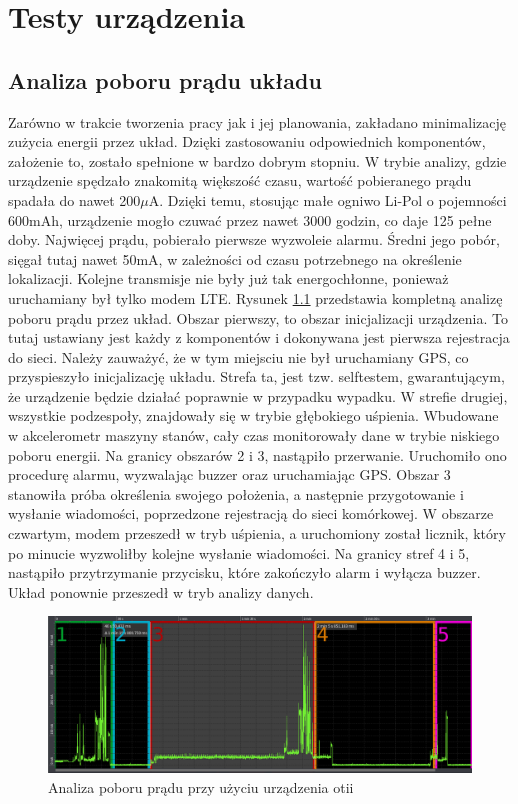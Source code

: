 \chapter{Testy urządzenia}
\section{Analiza poboru prądu układu}
Zarówno w trakcie tworzenia pracy jak i jej planowania, zakładano minimalizację zużycia energii przez układ. Dzięki zastosowaniu odpowiednich komponentów, założenie to, zostało spełnione w bardzo dobrym stopniu. W trybie analizy, gdzie urządzenie spędzało znakomitą większość czasu, wartość pobieranego prądu spadała do nawet 200$\mu$A. Dzięki temu, stosując małe ogniwo Li-Pol o pojemności 600mAh, urządzenie mogło czuwać przez nawet 3000 godzin, co daje 125 pełne doby. Najwięcej prądu, pobierało pierwsze wyzwoleie alarmu. Średni jego pobór, sięgał tutaj nawet 50mA, w zależności od czasu potrzebnego na określenie lokalizacji. Kolejne transmisje nie były już tak energochłonne, ponieważ uruchamiany był tylko modem LTE.
\newline
Rysunek \ref{img:current_summary} przedstawia kompletną analizę poboru prądu przez układ. Obszar pierwszy, to obszar inicjalizacji urządzenia. To tutaj ustawiany jest każdy z komponentów i dokonywana jest pierwsza rejestracja do sieci. Należy zauważyć, że w tym miejsciu nie był uruchamiany GPS, co przyspieszyło inicjalizację układu. Strefa ta, jest tzw. selftestem, gwarantującym, że urządzenie będzie działać poprawnie w przypadku wypadku. W strefie drugiej, wszystkie podzespoły, znajdowały się w trybie głębokiego uśpienia. Wbudowane w akcelerometr maszyny stanów, cały czas monitorowały dane w trybie niskiego poboru energii. Na granicy obszarów 2 i 3, nastąpiło przerwanie. Uruchomiło ono procedurę alarmu, wyzwalając buzzer oraz uruchamiając GPS. Obszar 3 stanowiła próba określenia swojego położenia, a następnie przygotowanie i wysłanie wiadomości, poprzedzone rejestracją do sieci komórkowej. W obszarze czwartym, modem przeszedł w tryb uśpienia, a uruchomiony został licznik, który po minucie wyzwoliłby kolejne wysłanie wiadomości. Na granicy stref 4 i 5, nastąpiło przytrzymanie przycisku, które zakończyło alarm i wyłącza buzzer. Układ ponownie przeszedł w tryb analizy danych.
	

\begin{figure}[h]
    \centering
    \includegraphics[width=14cm]{Graphics/connection_with_fix_divided.png}
    \caption{Analiza poboru prądu przy użyciu urządzenia otii}
    \label{img:current_summary}
\end{figure}

